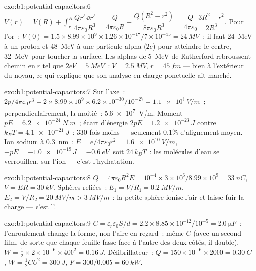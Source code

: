 \begin{solution}{exo:b1:potential-capacitors:6}
$V(r) = V(R) + \displaystyle\int_r^R\dfrac{Qr'\,\dd r'}{4\pi\varepsilon_0R^3} =
\dfrac{Q}{4\pi\varepsilon_0R} + \dfrac{Q(R^2 - r^2)}{8\pi\varepsilon_0R^3} = \dfrac{Q}{4\pi\varepsilon_0}
\dfrac{3R^2 - r^2}{2R^3}$. Pour l'or~: $V(0) = 1.5 \times 8.99 \times 10^9 \times 1.26 \times
10^{-17}/7 \times 10^{-15} = \qty{24}{MV}$~: il faut \qty{24}{MeV} à un proton et
\qty{48}{MeV} à une particule alpha ($2e$) pour atteindre le centre, \qty{32}{MeV}
pour toucher la surface. Les alphas de \qty{5}{MeV} de Rutherford rebroussent chemin en $r$ tel que $2eV =
\qty{5}{MeV}$~: $V = \qty{2.5}{MV}$, $r = \qty{45}{fm}$ --- bien à l'extérieur
du noyau, ce qui explique que son analyse en charge ponctuelle ait marché.
\end{solution}

\begin{solution}{exo:b1:potential-capacitors:7}
Sur l'axe~: $2p/4\pi\varepsilon_0r^3 = 2 \times 8.99 \times 10^9 \times 6.2 \times 10^{-30}/10^{-27} =
\qty{1.1e8}{V/m}$~; perpendiculairement, la moitié~: \qty{5.6e7}{V/m}. Moment $pE =
\qty{6.2e-24}{N.m}$~; écart d'énergie $2pE = \qty{1.2e-23}{J}$ contre $k_BT =
\qty{4.1e-21}{J}$~: $330$ fois moins --- seulement $0.1\%$ d'alignement moyen.
Ion sodium à \qty{0.3}{nm}~: $E = e/4\pi\varepsilon_0r^2 = \qty{1.6e10}{V/m}$, $-pE
= \qty{-1.0e-19}{J} = \qty{-0.6}{eV}$, soit $24\,k_BT$~: les molécules d'eau se
verrouillent sur l'ion --- c'est l'hydratation.
\end{solution}

\begin{solution}{exo:b1:potential-capacitors:8}
$Q = 4\pi\varepsilon_0R^2E = 10^{-4} \times 3 \times 10^6/8.99 \times 10^9 = \qty{33}{nC}$,
$V = ER = \qty{30}{kV}$. Sphères reliées~: $E_1 = V/R_1 = \qty{0.2}{MV/m}$,
$E_2 = V/R_2 = \qty{20}{MV/m} > \qty{3}{MV/m}$~: la petite sphère ionise l'air
et laisse fuir la charge --- c'est l'.
\end{solution}

\begin{solution}{exo:b1:potential-capacitors:9}
$C = \varepsilon_r\varepsilon_0S/d = 2.2 \times 8.85 \times 10^{-12}/10^{-5} = \qty{2.0}{\micro F}$~;
l'enroulement change la forme, non l'aire en regard~: même $C$ (avec un second
film, de sorte que chaque feuille fasse face à l'autre des deux côtés, il double).
$W = \tfrac12 \times 2 \times 10^{-6} \times 400^2 = \qty{0.16}{J}$. Défibrillateur~:
$Q = 150 \times 10^{-6} \times 2000 = \qty{0.30}{C}$, $W = \tfrac12CU^2 = \qty{300}{J}$,
$P = 300/0.005 = \qty{60}{kW}$.
\end{solution}

